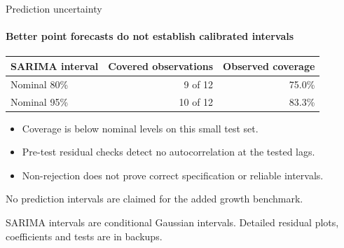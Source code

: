 \documentclass[aspectratio=169,10pt]{beamer}
\newcommand{\Source}[1]{\par\vfill{\fontsize{6.5}{7.5}\selectfont\color{black!65}#1\par}}
\begin{document}
\begin{frame}[t]{Prediction uncertainty}
\framesubtitle{Better point forecasts do not establish calibrated intervals}
\begin{center}
\begin{tabular}{lrr}\toprule
SARIMA interval & Covered observations & Observed coverage\\\midrule
Nominal 80\% & 9 of 12 & 75.0\%\\
Nominal 95\% & 10 of 12 & 83.3\%\\\bottomrule
\end{tabular}
\end{center}
\begin{itemize}
\item Coverage is below nominal levels on this small test set.
\item Pre-test residual checks detect no autocorrelation at the tested lags.
\item Non-rejection does not prove correct specification or reliable intervals.
\end{itemize}
No prediction intervals are claimed for the added growth benchmark.
\Source{SARIMA intervals are conditional Gaussian intervals. Detailed residual plots, coefficients and tests are in backups.}
\end{frame}
\end{document}
